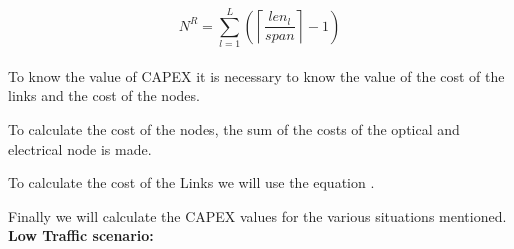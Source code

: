 \begin{equation}
N^R = \sum\limits_{l=1}^L\left(\left\lceil\frac{len_l}{span}\right\rceil-1\right)
\label{amplifiersTranslu}
\end{equation} \\

To know the value of CAPEX it is necessary to know the value of the cost of the links and the cost of the nodes.

To calculate the cost of the nodes, the sum of the costs of the optical and electrical node is made. %

	



To calculate the cost of the Links we will use the equation .

	

Finally we will calculate the CAPEX values for the various situations mentioned.\\

\textbf{Low Traffic scenario:}\\


